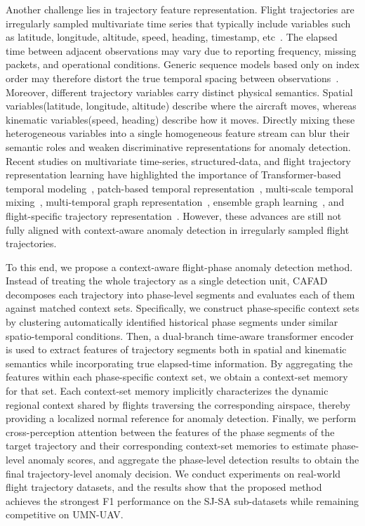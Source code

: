 \documentclass[iicol,pdflatex,sn-basic,Numbered]{sn-jnl}%
\theoremstyle{thmstyleone}%
\theoremstyle{thmstyletwo}%
\theoremstyle{thmstylethree}%
\begin{document}
Another challenge lies in trajectory feature representation. 
Flight trajectories are irregularly sampled multivariate time series that typically include variables such as latitude, longitude, altitude, speed, heading, timestamp, etc~\cite{ahmed2026towards}.
The elapsed time between adjacent observations may vary due to reporting frequency, missing packets, and operational conditions. 
Generic sequence models based only on index order may therefore distort the true temporal spacing between observations~\cite{kreindler2016effects,li2020learning,kidger2020neuralcde,shukla2021mtnet,braun2022sampling}. 
Moreover, different trajectory variables carry distinct physical semantics. 
Spatial variables(latitude, longitude, altitude) describe where the aircraft moves, whereas kinematic variables(speed, heading) describe how it moves. 
Directly mixing these heterogeneous variables into a single homogeneous feature stream can blur their semantic roles and weaken discriminative representations for anomaly detection. 
Recent studies on multivariate time-series, structured-data, and flight trajectory representation learning have highlighted the importance of Transformer-based temporal modeling~\cite{zerveas2021transformer,xu2022anomalytransformer}, patch-based temporal representation~\cite{nie2023patchtst}, multi-scale temporal mixing~\cite{wang2024timemixer}, multi-temporal graph representation~\cite{guang2025mtpnet}, ensemble graph learning~\cite{guang2026ensnet}, and flight-specific trajectory representation~\cite{aerospace9020091,10877800,liu2025effective}.
However, these advances are still not fully aligned with context-aware anomaly detection in irregularly sampled flight trajectories.

To this end, we propose a context-aware flight-phase anomaly detection method. 
Instead of treating the whole trajectory as a single detection unit, CAFAD decomposes each trajectory into phase-level segments and evaluates each of them against matched context sets. 
Specifically, we construct phase-specific context sets by clustering automatically identified historical phase segments under similar spatio-temporal conditions. 
Then, a dual-branch time-aware transformer encoder is used to extract features of trajectory segments both in spatial and kinematic semantics while incorporating true elapsed-time information. 
By aggregating the features within each phase-specific context set, we obtain a context-set memory for that set.
Each context-set memory implicitly characterizes the dynamic regional context shared by flights traversing the corresponding airspace, thereby providing a localized normal reference for anomaly detection. 
Finally, we perform cross-perception attention between the features of the phase segments of the target trajectory and their corresponding context-set memories to estimate phase-level anomaly scores, and aggregate the phase-level detection results to obtain the final trajectory-level anomaly decision.
We conduct experiments on real-world flight trajectory datasets, and the results show that the proposed method achieves the strongest F1 performance on the SJ-SA sub-datasets while remaining competitive on UMN-UAV.
\end{document}
